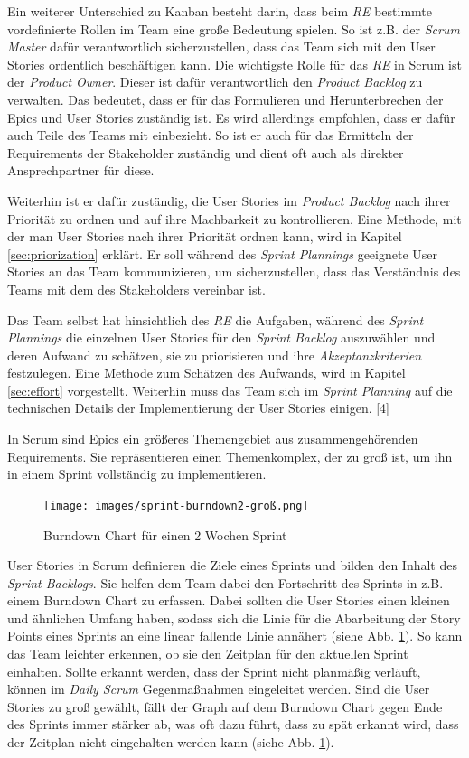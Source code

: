 \documentclass[acmtog]{acmart}
\begin{document}
Ein weiterer Unterschied zu Kanban besteht darin, dass beim \emph{RE} bestimmte vordefinierte Rollen im Team eine 
große Bedeutung spielen. So ist z.B. der \emph{Scrum Master} dafür verantwortlich sicherzustellen, dass das Team sich mit den 
User Stories ordentlich beschäftigen kann. Die wichtigste Rolle für das \emph{RE} in Scrum ist der \emph{Product Owner}. Dieser ist 
dafür verantwortlich den \emph{Product Backlog} zu verwalten. Das bedeutet, dass er für das Formulieren und Herunterbrechen der 
Epics und User Stories zuständig ist. Es wird allerdings empfohlen, dass er dafür auch Teile des Teams mit einbezieht. So ist er auch für 
das Ermitteln der Requirements der Stakeholder zuständig und dient oft auch als direkter Ansprechpartner für diese. \cite{reinscrum}

Weiterhin ist er dafür zuständig, die User Stories im \emph{Product Backlog} nach ihrer Priorität zu ordnen und auf ihre Machbarkeit 
zu kontrollieren. Eine Methode, mit der man User Stories nach ihrer Priorität ordnen kann, wird in Kapitel \ref{sec:priorization} erklärt. 
Er soll während des \emph{Sprint Plannings} geeignete User Stories an das Team kommunizieren, um sicherzustellen, dass das Verständnis 
des Teams mit dem des Stakeholders vereinbar ist. \cite{reinscrum}

Das Team selbst hat hinsichtlich des \emph{RE} die Aufgaben, während des \emph{Sprint Plannings} die einzelnen User Stories für den \emph{Sprint 
Backlog} auszuwählen und deren Aufwand zu schätzen, sie zu priorisieren und ihre \emph{Akzeptanzkriterien} festzulegen. Eine Methode zum Schätzen des Aufwands, wird in Kapitel \ref{sec:effort} vorgestellt. 
Weiterhin muss das Team sich im \emph{Sprint Planning} auf die technischen Details der Implementierung der User Stories einigen. [4]

In Scrum sind Epics ein größeres Themengebiet aus zusammengehörenden Requirements. Sie repräsentieren einen Themenkomplex, der 
zu groß ist, um ihn in einem Sprint vollständig zu implementieren. \cite{reinscrum}

\begin{figure}[t]
  \centering
  \texttt{[image: images/sprint-burndown2-groß.png]}
  \caption{Burndown Chart für einen 2 Wochen Sprint}
    \label{fig:burndownchart}
  \Description{}
\end{figure}

User Stories in Scrum definieren die Ziele eines Sprints und bilden den Inhalt des \emph{Sprint Backlogs}. Sie helfen dem Team dabei den Fortschritt 
des Sprints in z.B. einem Burndown Chart zu erfassen. Dabei sollten die User Stories einen kleinen und ähnlichen Umfang haben, sodass 
sich die Linie für die Abarbeitung der Story Points eines Sprints an eine linear fallende Linie annähert (siehe Abb. \ref{fig:burndownchart}). So kann das 
Team leichter erkennen, ob sie den Zeitplan für den aktuellen Sprint einhalten. Sollte erkannt werden, dass der Sprint nicht planmäßig verläuft, können im 
\emph{Daily Scrum} Gegenmaßnahmen eingeleitet werden. Sind die User Stories zu groß gewählt, fällt der 
Graph auf dem Burndown Chart gegen Ende des Sprints immer stärker ab, was oft dazu führt, dass zu spät erkannt wird, dass der Zeitplan 
nicht eingehalten werden kann (siehe Abb. \ref{fig:burndownchart}). \cite{reinscrum} 
\end{document}
